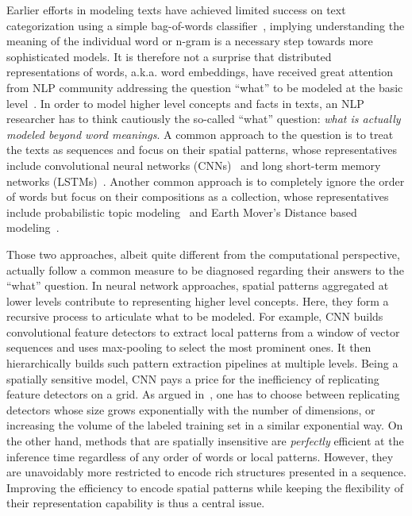 \documentclass[11pt]{article}
\begin{document}
Earlier efforts in modeling texts have achieved
limited success on text categorization using a simple bag-of-words classifier~\cite{joachims1998text,mccallum1998comparison}, 
implying understanding the meaning of the individual word or n-gram is a necessary step towards more sophisticated models. 
It is therefore not a surprise that distributed representations of words, a.k.a. word embeddings, have
received great attention from NLP community addressing the question ``what'' to be modeled at the basic level~\cite{mikolov2013distributed,pennington2014glove}.  
In order to model higher level concepts and facts in texts, an NLP researcher 
has to think cautiously the so-called ``what'' question: \textit{what is actually modeled beyond word meanings}. 
A common approach to the question is to treat the texts as sequences and focus on their spatial patterns, whose representatives include convolutional neural networks (CNNs)~\cite{kim2014convolutional,zhang2015character,conneau2017very} and long short-term memory networks (LSTMs)~\cite{tai2015improved,mousa2017contextual}. 
Another common approach is to completely ignore the order of words but focus on their compositions as a collection,
whose representatives include probabilistic topic modeling~\cite{blei2003latent,mcauliffe2008supervised} 
and Earth Mover's Distance based modeling~\cite{kusner2015word,ye2017determining}. 

Those two approaches, albeit quite different from the computational perspective, actually follow
a common measure to be diagnosed regarding their answers to the ``what'' question. 
In neural network approaches, spatial patterns aggregated at lower levels contribute to representing higher level concepts. 
Here, they form a recursive process to articulate what to be modeled. For example, CNN builds convolutional feature detectors
to extract local patterns from a window of vector sequences and uses max-pooling to select the most prominent ones. 
It then hierarchically builds such pattern extraction pipelines at multiple levels.
Being a spatially sensitive model, CNN pays a price for the inefficiency of replicating feature detectors on a grid. 
As argued in~\cite{sabour2017dynamic}, one has to choose between replicating detectors whose size 
grows exponentially with the number of dimensions, or increasing the volume of the labeled training set in a similar exponential way.  
On the other hand, methods that are spatially insensitive are \textit{perfectly}
efficient at the inference time regardless of any order of words or local patterns. 
However, they are unavoidably more restricted to encode rich structures presented in a sequence.
Improving the efficiency to encode spatial patterns while keeping the flexibility of their representation capability
is thus a central issue. 
\end{document}
